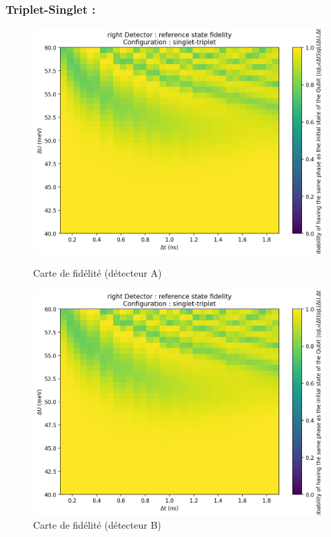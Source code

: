 \documentclass{article}
\begin{document}
\subsubsection{Triplet-Singlet :}

\begin{figure}[H]
  \centering
  \begin{minipage}[c]{0.48\textwidth}
    \centering
    \includegraphics[width=\textwidth]{p_detector_overlap_map_33x33_20250822-003725_faible.png}
    \caption{Carte de fidélité (détecteur A)}
    \label{fig:fidelity_map_a}
  \end{minipage}\hfill
  \begin{minipage}[c]{0.48\textwidth}
    \centering
    \includegraphics[width=\textwidth]{p_detector_overlap_map_33x33_20250822-003725_faible.png}
    \caption{Carte de fidélité (détecteur B)}
    \label{fig:fidelity_map_b}
  \end{minipage}
\end{figure}
\end{document}
